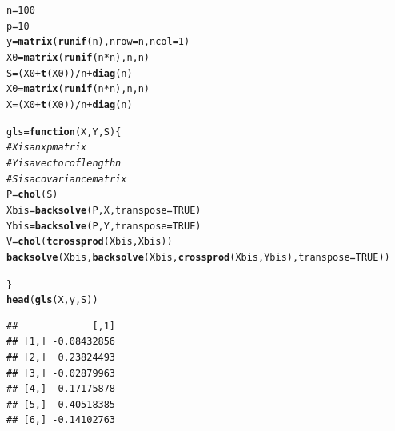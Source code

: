 \documentclass{llncs}\usepackage[]{graphicx}\usepackage[]{color}
\makeatletter
\newcommand{\hlnum}[1]{\textcolor[rgb]{0.686,0.059,0.569}{#1}}%
\newcommand{\hlcom}[1]{\textcolor[rgb]{0.678,0.584,0.686}{\textit{#1}}}%
\newcommand{\hlopt}[1]{\textcolor[rgb]{0,0,0}{#1}}%
\newcommand{\hlstd}[1]{\textcolor[rgb]{0.345,0.345,0.345}{#1}}%
\newcommand{\hlkwa}[1]{\textcolor[rgb]{0.161,0.373,0.58}{\textbf{#1}}}%
\newcommand{\hlkwb}[1]{\textcolor[rgb]{0.69,0.353,0.396}{#1}}%
\newcommand{\hlkwc}[1]{\textcolor[rgb]{0.333,0.667,0.333}{#1}}%
\newcommand{\hlkwd}[1]{\textcolor[rgb]{0.737,0.353,0.396}{\textbf{#1}}}%
\newenvironment{kframe}{%
 \def\at@end@of@kframe{}%
 \ifinner\ifhmode%
  \def\at@end@of@kframe{\end{minipage}}%
  \begin{minipage}{\columnwidth}%
 \fi\fi%
 \def\FrameCommand##1{\hskip\@totalleftmargin \hskip-\fboxsep
 \colorbox{shadecolor}{##1}\hskip-\fboxsep
     \hskip-\linewidth \hskip-\@totalleftmargin \hskip\columnwidth}%
 \MakeFramed {\advance\hsize-\width
   \@totalleftmargin\z@ \linewidth\hsize
   \@setminipage}}%
 {\par\unskip\endMakeFramed%
 \at@end@of@kframe}
\newenvironment{knitrout}{}{} %
\makeatother
\begin{document}
\begin{knitrout}
\color{fgcolor}\begin{kframe}
\begin{alltt}
\hlstd{n}\hlkwb{=}\hlnum{100}
\hlstd{p}\hlkwb{=}\hlnum{10}
\hlstd{y}\hlkwb{=}\hlkwd{matrix}\hlstd{(}\hlkwd{runif}\hlstd{(n),}\hlkwc{nrow}\hlstd{=n,}\hlkwc{ncol}\hlstd{=}\hlnum{1}\hlstd{)}
\hlstd{X0}\hlkwb{=}\hlkwd{matrix}\hlstd{(}\hlkwd{runif}\hlstd{(n}\hlopt{*}\hlstd{n),n,n)}
\hlstd{S}\hlkwb{=}\hlstd{(X0}\hlopt{+}\hlkwd{t}\hlstd{(X0))}\hlopt{/}\hlstd{n}\hlopt{+}\hlkwd{diag}\hlstd{(n)}
\hlstd{X0}\hlkwb{=}\hlkwd{matrix}\hlstd{(}\hlkwd{runif}\hlstd{(n}\hlopt{*}\hlstd{n),n,n)}
\hlstd{X}\hlkwb{=}\hlstd{(X0}\hlopt{+}\hlkwd{t}\hlstd{(X0))}\hlopt{/}\hlstd{n}\hlopt{+}\hlkwd{diag}\hlstd{(n)}

\hlstd{gls} \hlkwb{=} \hlkwa{function}\hlstd{(}\hlkwc{X}\hlstd{,}\hlkwc{Y}\hlstd{,}\hlkwc{S}\hlstd{)\{}
  \hlcom{# X is a nxp matrix}
  \hlcom{# Y is a vector of length n}
  \hlcom{# S is a covariance matrix}
  \hlstd{P}\hlkwb{=}\hlkwd{chol}\hlstd{(S)}
  \hlstd{Xbis}\hlkwb{=}\hlkwd{backsolve}\hlstd{(P,X,}\hlkwc{transpose} \hlstd{=} \hlnum{TRUE}\hlstd{)}
  \hlstd{Ybis}\hlkwb{=}\hlkwd{backsolve}\hlstd{(P,Y,}\hlkwc{transpose} \hlstd{=} \hlnum{TRUE}\hlstd{)}
  \hlstd{V}\hlkwb{=}\hlkwd{chol}\hlstd{(}\hlkwd{tcrossprod}\hlstd{(Xbis,Xbis))}
  \hlkwd{backsolve}\hlstd{(Xbis,} \hlkwd{backsolve}\hlstd{(Xbis,} \hlkwd{crossprod}\hlstd{(Xbis,Ybis),} \hlkwc{transpose} \hlstd{=} \hlnum{TRUE}\hlstd{))}

\hlstd{\}}
\hlkwd{head}\hlstd{(}\hlkwd{gls}\hlstd{(X,y,S))}
\end{alltt}
\begin{lstlisting}[basicstyle=\ttfamily,breaklines=true]
##             [,1]
## [1,] -0.08432856
## [2,]  0.23824493
## [3,] -0.02879963
## [4,] -0.17175878
## [5,]  0.40518385
## [6,] -0.14102763
\end{lstlisting}
\end{kframe}
\end{knitrout}

\section{}
\end{document}

